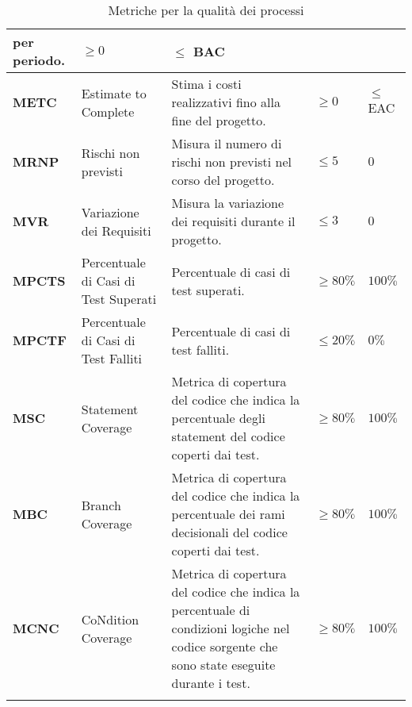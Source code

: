 \begin{longtable}{|C{1.5cm}|L{3cm}|L{4cm}|L{2.5cm}|L{2.5cm}|}
        per periodo. & $\geq 0  $ & $ \leq$ BAC  \\
        \hline
        \textbf{METC} & Estimate to Complete &  Stima i costi realizzativi fino alla fine del progetto. & $\geq 0  $ & $ \leq$ EAC  \\
        \hline
        \textbf{MRNP}    & Rischi non previsti   & Misura il numero di rischi non previsti nel corso del progetto. & $\leq 5$ &   $0$ \\
        \hline
        \textbf{MVR} & Variazione dei Requisiti & Misura la variazione dei requisiti durante il progetto. & $\leq 3$ & $0$ \\
        \hline
        \textbf{MPCTS} & Percentuale di Casi di Test Superati & Percentuale di casi di test superati. & $\geq 80\%$ & $100\%$ \\
        \hline
        \textbf{MPCTF} & Percentuale di Casi di Test Falliti & Percentuale di casi di test falliti. & $\leq 20\%$ & $0\%$ \\
        \hline
        \textbf{MSC} & Statement Coverage & Metrica di copertura del codice che indica la percentuale degli statement del codice coperti dai test. & $\geq 80\%$ & $100\%$ \\
        \hline
        \textbf{MBC} & Branch Coverage & Metrica di copertura del codice che indica la percentuale dei rami decisionali del codice coperti dai test. & $\geq 80\%$ & $100\%$ \\
        \hline
        \textbf{MCNC} & CoNdition Coverage & Metrica di copertura del codice che indica la percentuale di condizioni logiche nel codice sorgente che sono state eseguite durante i test. & $\geq 80\%$ & $100\%$ \\
        \hline
        \caption{Metriche per la qualità dei processi}
        \label{tab:qualità_processo_progetto}
        \end{longtable}